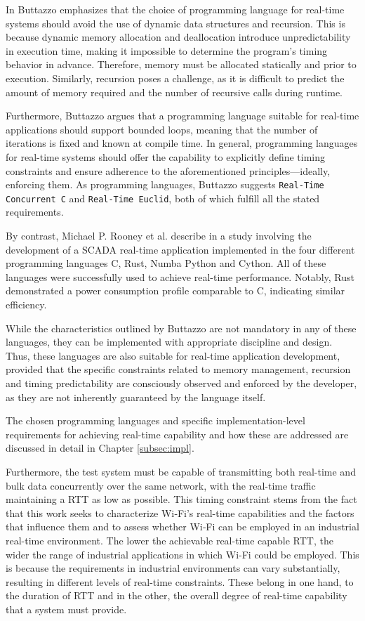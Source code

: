 In \cite[p. 17, 18]{Buttazzo_2024} Buttazzo emphasizes that the choice of programming language for real-time systems should avoid the use of dynamic data structures and recursion. 
This is because dynamic memory allocation and deallocation introduce unpredictability in execution time, making it impossible to determine the program's timing behavior in advance. 
Therefore, memory must be allocated statically and prior to execution. 
Similarly, recursion poses a challenge, as it is difficult to predict the amount of memory required and the number of recursive calls during runtime.

Furthermore, Buttazzo argues that a programming language suitable for real-time applications should support bounded loops, meaning that the number of iterations is fixed and known at compile time. 
In general, programming languages for real-time systems should offer the capability to explicitly define timing constraints and ensure adherence to the aforementioned principles—ideally, enforcing them.
As programming languages, Buttazzo suggests \texttt{Real-Time Concurrent C} and \texttt{Real-Time Euclid}, both of which fulfill all the stated requirements.

By contrast, Michael P. Rooney et al. describe in \cite[p. 1]{10321761} a study involving the development of a \ac{SCADA} real-time application implemented in the four different programming languages C, Rust, Numba Python and Cython.
All of these languages were successfully used to achieve real-time performance. 
Notably, Rust demonstrated a power consumption profile comparable to C, indicating similar efficiency.

While the characteristics outlined by Buttazzo are not mandatory in any of these languages, they can be implemented with appropriate discipline and design. 
Thus, these languages are also suitable for real-time application development, provided that the specific constraints related to memory management, recursion and timing predictability are consciously observed and enforced by the developer, as they are not inherently guaranteed by the language itself.

The chosen programming languages and specific implementation-level requirements for achieving real-time capability and how these are addressed are discussed in detail in Chapter \ref{subsec:impl}.

Furthermore, the test system must be capable of transmitting both real-time and bulk data concurrently over the same network, with the real-time traffic maintaining a \ac{RTT} as low as possible. 
This timing constraint stems from the fact that this work seeks to characterize Wi‑Fi’s real-time capabilities and the factors that influence them and to assess whether Wi‑Fi can be employed in an industrial real-time environment. 
The lower the achievable real-time capable \ac{RTT}, the wider the range of industrial applications in which Wi-Fi could be employed. 
This is because the requirements in industrial environments can vary substantially, resulting in different levels of real-time constraints.
These belong in one hand, to the duration of \ac{RTT} and in the other, the overall degree of real-time capability that a system must provide.

